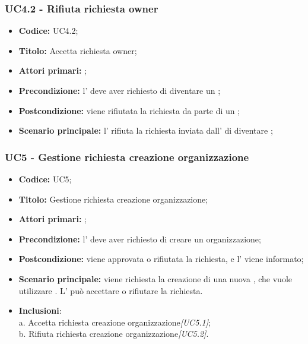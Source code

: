\documentclass[casi-duso]{subfiles}
\begin{document}
\subsubsection{UC4.2 - Rifiuta richiesta owner}
\label{subsub:UC4.2}

\begin{itemize}
  \item \textbf{Codice:} UC4.2;
  \item \textbf{Titolo:} Accetta richiesta owner;
  \item \textbf{Attori primari:} ;
  \item \textbf{Precondizione:} l' deve aver richiesto di diventare un ;
  \item \textbf{Postcondizione:} viene rifiutata la richiesta da parte di un ;
  \item \textbf{Scenario principale:} l' rifiuta la richiesta inviata dall' di diventare ;
\end{itemize}

\subsubsection{UC5 - Gestione richiesta creazione organizzazione}
\label{subsub:UC5}
\begin{itemize}
  \item \textbf{Codice:} UC5;
  \item \textbf{Titolo:} Gestione richiesta creazione organizzazione;
  \item \textbf{Attori primari:} ;
  \item \textbf{Precondizione:} l' deve aver richiesto di creare un organizzazione;
  \item \textbf{Postcondizione:} viene approvata o rifiutata la richiesta, e l' viene informato;
  \item \textbf{Scenario principale:} viene richiesta la creazione di una nuova , che vuole utilizzare . 
  L' può accettare o rifiutare la richiesta.
  \item \textbf{Inclusioni}:
        \\a. Accetta richiesta creazione organizzazione\emph{[UC5.1]};
        \\b. Rifiuta richiesta creazione organizzazione\emph{[UC5.2]}.
\end{itemize}
\end{document}
